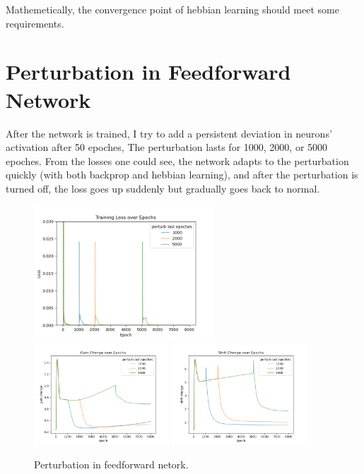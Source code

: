 \documentclass[12pt, a4paper]{article}
\begin{document}
Mathemetically, the convergence point of hebbian learning should meet some requirements.


\section*{Perturbation in Feedforward Network}

After the network is trained, I try to add a persistent deviation in neurons' activation after 50 epoches, The perturbation lasts for 1000, 2000, or 5000 epoches. From the losses one could see, the network adapts to the perturbation quickly (with both backprop and hebbian learning), and after the perturbation is turned off, the loss goes up suddenly but gradually goes back to normal.

\begin{figure}[H]
    \centering
    \includegraphics[width=0.6\textwidth]{baseline_abb05/fig/0122_abb05_perturb_loss.png} \\
    \includegraphics[width=0.45\textwidth]{baseline_abb05/fig/0122_abb05_perturb_gc.png} 
    \includegraphics[width=0.45\textwidth]{baseline_abb05/fig/0122_abb05_perturb_sc.png}
    \caption{Perturbation in feedforward netork.}
\end{figure}
\end{document}
